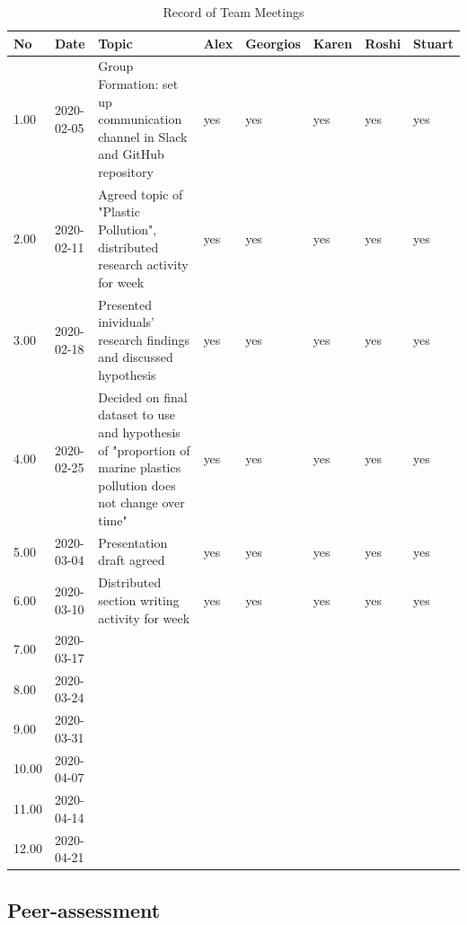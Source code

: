 \documentclass[10pt]{article}\usepackage[]{graphicx}\usepackage[]{color}
\begin{document}
\begin{table}[ht]
\centering
\caption{Record of Team Meetings} 
\label{tab:one}
\begin{tabular}{llp{8cm}lllll}
  \hline
No & Date & Topic & Alex & Georgios & Karen & Roshi & Stuart \\ 
  \hline
1.00 & 2020-02-05 & Group Formation: set up communication channel in Slack and GitHub repository & yes & yes & yes & yes & yes \\ 
  2.00 & 2020-02-11 & Agreed topic of "Plastic Pollution", distributed research activity for week & yes & yes & yes & yes & yes \\ 
  3.00 & 2020-02-18 & Presented inividuals' research findings and discussed hypothesis & yes & yes & yes & yes & yes \\ 
  4.00 & 2020-02-25 & Decided on final dataset to use and hypothesis of "proportion of marine plastics pollution does not change over time" & yes & yes & yes & yes & yes \\ 
  5.00 & 2020-03-04 & Presentation draft agreed & yes & yes & yes & yes & yes \\ 
  6.00 & 2020-03-10 & Distributed section writing activity for week & yes & yes & yes & yes & yes \\ 
  7.00 & 2020-03-17 &  &  &  &  &  &  \\ 
  8.00 & 2020-03-24 &  &  &  &  &  &  \\ 
  9.00 & 2020-03-31 &  &  &  &  &  &  \\ 
  10.00 & 2020-04-07 &  &  &  &  &  &  \\ 
  11.00 & 2020-04-14 &  &  &  &  &  &  \\ 
  12.00 & 2020-04-21 &  &  &  &  &  &  \\ 
   \hline
\end{tabular}
\end{table}





\subsection{Peer-assessment}
\end{document}
